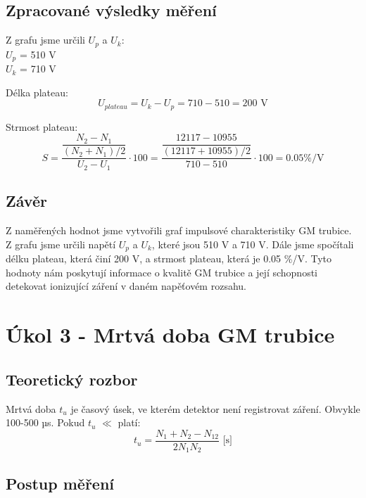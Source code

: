 \documentclass{protokol}
\begin{document}
    \subsection{Zpracované výsledky měření}

    Z grafu jsme určili $U_p$ a $U_k$:
    \\
    $U_p$ = 510 V\\
    $U_k$ = 710 V

    Délka plateau:
    \begin{equation}
        U_{plateau} = U_k - U_p = 710 - 510 = 200 \text{ V}
    \end{equation}

    Strmost plateau:
    \begin{equation}   
        S =  \dfrac{\dfrac{N_2-N_1}{(N_2+N_1)/2}}{U_2-U_1} \cdot 100 = \dfrac{\dfrac{12117-10955}{(12117+10955)/2}}{710-510} \cdot 100 = 0.05  \% / \text{V}
    \end{equation}
    
    \subsection{Závěr}
    Z naměřených hodnot jsme vytvořili graf impulsové charakteristiky GM trubice. Z grafu jsme určili napětí $U_p$ a $U_k$, které jsou 510 V a 710 V. Dále jsme spočítali délku plateau, která činí 200 V, a strmost plateau, která je 0.05 \%/V. Tyto hodnoty nám poskytují informace o kvalitě GM trubice a její schopnosti detekovat ionizující záření v daném napěťovém rozsahu.

\pagebreak

\section{Úkol 3 - Mrtvá doba GM trubice}
    \subsection{Teoretický rozbor}

    Mrtvá doba $t_u$ je časový úsek, ve kterém detektor není registrovat záření. Obvykle 100-500 µs. Pokud $t_u$ $\ll$  platí:
    \begin{equation}   
        t_u =  \dfrac{N_1+N_2-N_{12}}{2N_1N_2}  \text{     [s]}
    \end{equation}

    \subsection{Postup měření}
\end{document}

